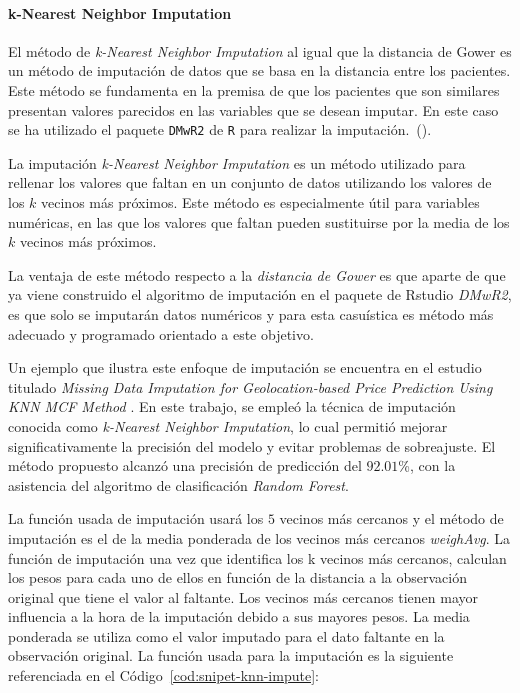 \paragraph{k-Nearest Neighbor Imputation}\label{sec:k_Nearest Neighbor_Imputation}

El método de \textit{k-Nearest Neighbor Imputation} al igual que la distancia de Gower es un método de imputación de datos que se basa en la distancia entre los pacientes. Este método se fundamenta en la premisa de que los pacientes que son similares presentan valores parecidos en las variables que se desean imputar. En este caso se ha utilizado el paquete \texttt{DMwR2} de \texttt{R} para realizar la imputación.~(\cite{DMwR2}).

La imputación \textit{k-Nearest Neighbor Imputation} es un método utilizado para rellenar los valores que faltan en un conjunto de datos utilizando los valores de los $k$ vecinos más próximos. Este método es especialmente útil para variables numéricas, en las que los valores que faltan pueden sustituirse por la media de los $k$ vecinos más próximos.

La ventaja de este método respecto a la \textit{distancia de Gower} es que aparte de que ya viene construido el algoritmo de imputación en el paquete de Rstudio \textit{DMwR2}, es que solo se imputarán datos numéricos y para esta casuística es método más adecuado y programado orientado a este objetivo.

Un ejemplo que ilustra este enfoque de imputación se encuentra en el estudio titulado \textit{Missing Data Imputation for Geolocation-based Price Prediction Using KNN MCF Method} \cite{Sanjar2020}. En este trabajo, se empleó la técnica de imputación conocida como \textit{k-Nearest Neighbor Imputation}, lo cual permitió mejorar significativamente la precisión del modelo y evitar problemas de sobreajuste. El método propuesto alcanzó una precisión de predicción del $92.01$\%, con la asistencia del algoritmo de clasificación \textit{Random Forest}.

La función usada de imputación usará los $5$ vecinos más cercanos y el método de imputación es el de la media ponderada de los vecinos más cercanos \textit{weighAvg}. La función de imputación una vez que identifica los k vecinos más cercanos, calculan los pesos para cada uno de ellos en función de la distancia a la observación original que tiene el valor al faltante. Los vecinos más cercanos tienen mayor influencia a la hora de la imputación debido a sus mayores pesos. La media ponderada se utiliza como el valor imputado para el dato faltante en la observación original. La función usada para la imputación es la siguiente referenciada en el Código~\ref{cod:snipet-knn-impute}:

